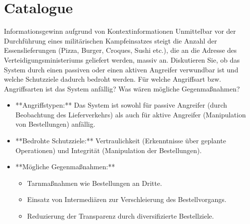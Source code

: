 \documentclass{article}
\begin{document}
\section{Catalogue}

\setcounter{subsection}{34}
\begin{exercise}{Informationsgewinn aufgrund von Kontextinformationen}
  Unmittelbar vor der Durchführung eines militärischen Kampfeinsatzes steigt die Anzahl der Essenslieferungen (Pizza, Burger, Croques, Sushi etc.), die an die Adresse des Verteidigungsministeriums geliefert werden, massiv an. Diskutieren Sie, ob das System durch einen passiven oder einen aktiven Angreifer verwundbar ist und welche Schutzziele dadurch bedroht werden. Für welche Angriffsart bzw. Angriffsarten ist das System anfällig? Was wären mögliche Gegenmaßnahmen?

  \begin{solution}
    \begin{itemize}
      \item **Angriffstypen:** Das System ist sowohl für passive Angreifer (durch Beobachtung des Lieferverkehrs) als auch für aktive Angreifer (Manipulation von Bestellungen) anfällig.
      \item **Bedrohte Schutzziele:** Vertraulichkeit (Erkenntnisse über geplante Operationen) und Integrität (Manipulation der Bestellungen).
      \item **Mögliche Gegenmaßnahmen:**
        \begin{itemize}
          \item Tarnmaßnahmen wie Bestellungen an Dritte.
          \item Einsatz von Intermediären zur Verschleierung des Bestellvorgangs.
          \item Reduzierung der Transparenz durch diversifizierte Bestellziele.
        \end{itemize}
    \end{itemize}
  \end{solution}
\end{exercise}
\end{document}
